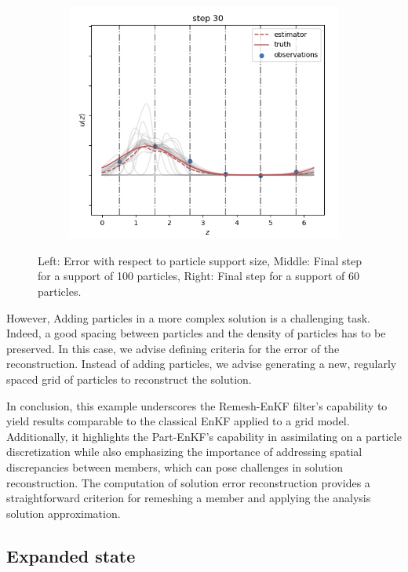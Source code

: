 \begin{figure}
\begin{subfigure}{0.29\textwidth}
		\includegraphics[width=\textwidth]{images/app1d/error_support/not_ok.png}
		\label{error_support3}
	\end{subfigure}
	\caption{Left: Error with respect to particle support size, Middle: Final step for a support of 100 particles, Right: Final step for a support of 60 particles.}
	\label{error_support}
\end{figure}
However, Adding particles in a more complex solution is a challenging task. Indeed, a good spacing between particles and the density of particles has to be preserved. In this case, we advise defining criteria for the error of the reconstruction. Instead of adding particles, we advise generating a new, regularly spaced grid of particles to reconstruct the solution.

In conclusion, this example underscores the Remesh-EnKF filter's capability to yield results comparable to the classical EnKF applied to a grid model. Additionally, it highlights the Part-EnKF's capability in assimilating on a particle discretization while also emphasizing the importance of addressing spatial discrepancies between members, which can pose challenges in solution reconstruction. The computation of solution error reconstruction provides a straightforward criterion for remeshing a member and applying the analysis solution approximation.

\subsection{Expanded state}

